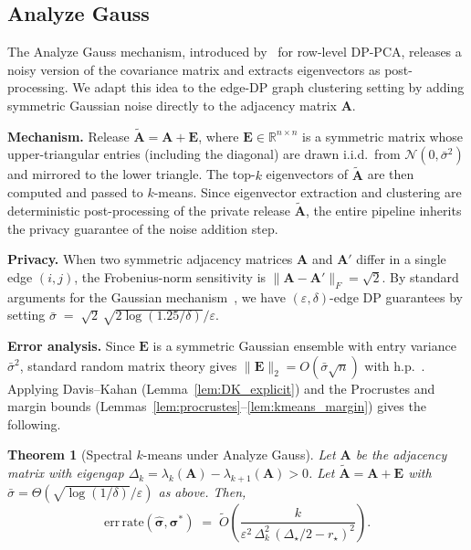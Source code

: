 \documentclass[11pt]{article}
\theoremstyle{plain}
\newtheorem{theorem}{Theorem}[section]
\theoremstyle{definition}
\theoremstyle{remark}
\begin{document}
\subsection{Analyze Gauss} \label{subsec:analyze_gauss}

The Analyze Gauss mechanism, introduced by~\citet{dwork2014analyze} for row-level DP-PCA, releases a noisy version of the covariance matrix and extracts eigenvectors as post-processing. We adapt this idea to the edge-DP graph clustering setting by adding symmetric Gaussian noise directly to the adjacency matrix $\mathbf{A}$.

\textbf{Mechanism.} Release $\widetilde{\mathbf{A}} = \mathbf{A} + \mathbf{E}$, where $\mathbf{E} \in \mathbb{R}^{n \times n}$ is a symmetric matrix whose upper-triangular entries (including the diagonal) are drawn i.i.d.\ from $\mathcal{N}(0, \bar{\sigma}^2)$ and mirrored to the lower triangle. The top-$k$ eigenvectors of $\widetilde{\mathbf{A}}$ are then computed and passed to $k$-means. Since eigenvector extraction and clustering are deterministic post-processing of the private release $\widetilde{\mathbf{A}}$, the entire pipeline inherits the privacy guarantee of the noise addition step.

\textbf{Privacy.} When two symmetric adjacency matrices $\mathbf{A}$ and $\mathbf{A}'$ differ in a single edge $(i,j)$, %
the Frobenius-norm sensitivity is $\|\mathbf{A} - \mathbf{A}'\|_F = \sqrt{2}$. By standard arguments for the Gaussian mechanism~\citep{dwork2006calibrating}, we have $(\varepsilon,\delta)$-edge DP guarantees by setting
$\bar{\sigma} \;=\; \sqrt{2}\,\sqrt{2\log(1.25/\delta)} / \varepsilon$.

\textbf{Error analysis.} Since $\mathbf{E}$ is a symmetric Gaussian ensemble with entry variance $\bar{\sigma}^2$, standard random matrix theory gives $\|\mathbf{E}\|_2 = O(\bar{\sigma}\sqrt{n})$ with h.p.~\citep[Sec.][]{vershynin2018high}. Applying Davis--Kahan (Lemma~\ref{lem:DK_explicit}) and the Procrustes and margin bounds (Lemmas~\ref{lem:procrustes}--\ref{lem:kmeans_margin}) gives the following.

\begin{theorem}[Spectral $k$-means under Analyze Gauss]
\label{thm:analyze_gauss}
Let $\mathbf{A}$ be the adjacency matrix with eigengap 
$\Delta_k = \lambda_k(\mathbf{A}) - \lambda_{k+1}(\mathbf{A}) > 0$. 
Let $\widetilde{\mathbf{A}} = \mathbf{A} + \mathbf{E}$ with 
$\bar{\sigma} = \Theta(\sqrt{\log(1/\delta)}/\varepsilon)$ as above. 
Then,
\[
\mathrm{err\,rate}(\hat{\bm{\sigma}}, \bm{\sigma}^\ast)
\;=\;
\tilde{O}\!\left(\frac{k}
{\varepsilon^2\,\Delta_k^2\,(\Delta_\star/2 - r_\star)^2}\right).
\]
\end{theorem}
\end{document}
